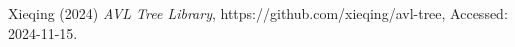 \documentclass[letterpaper,twocolumn,10pt]{article}
\begin{document}
%

%

%

%

%

\begin{thebibliography}{1}
Xieqing (2024) \emph{AVL Tree Library}, https://github.com/xieqing/avl-tree, Accessed: 2024-11-15.
\end{thebibliography}
\end{document}
